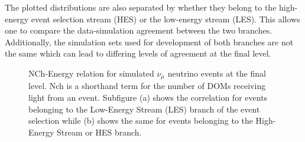 \documentclass{gatech-thesis}
\begin{document}
The plotted distributions are also separated by whether they belong to the high-energy event selection stream (HES) or the low-energy stream (LES). This allows one to compare the data-simulation agreement between the two branches. Additionally, the simulation sets used for development of both branches are not the same which can lead to differing levels of agreement at the final level.

\begin{figure}[0.05]\label{fig:FL_nch_by_energy}
\centering
{}
\caption{NCh-Energy relation for simulated $\nu_\mu$ neutrino events at the final level. Nch is a shorthand term for the number of DOMs receiving light from an event. Subfigure (a) shows the correlation for events belonging to the Low-Energy Stream (LES) branch of the event selection while (b) shows the same for events belonging to the High-Energy Stream or HES branch.} 
\end{figure}
\end{document}
